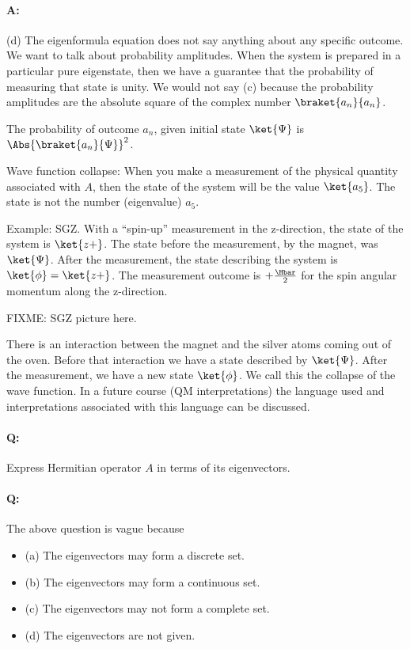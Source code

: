 \paragraph{A:} (d) The eigenformula equation does not say anything about any specific outcome.  We want to talk about probability amplitudes.  When the system is prepared in a particular pure eigenstate, then we have a guarantee that the probability of measuring that state is unity.  We would not say (c) because the probability amplitudes are the absolute square of the complex number $\braket{a_n}{a_n}$.

The probability of outcome $a_n$, given initial state $\ket{\Psi}$ is $\Abs{\braket{a_n}{\Psi}}^2$.

Wave function collapse:  When you make a measurement of the physical quantity associated with $A$, then the state of the system will be the value $\ket{a_5}$.  The state is not the number (eigenvalue) $a_5$.

Example: SGZ.  With a ``spin-up'' measurement in the z-direction, the state of the system is $\ket{z+}$.  The state before the measurement, by the magnet, was $\ket{\Psi}$.  After the measurement, the state describing the system is $\ket{\phi} = \ket{z+}$.  The measurement outcome is $+\frac{\Hbar}{2}$ for the spin angular momentum along the z-direction.

FIXME: SGZ picture here.

There is an interaction between the magnet and the silver atoms coming out of the oven.  Before that interaction we have a state described by $\ket{\Psi}$.  After the measurement, we have a new state $\ket{\phi}$.  We call this the collapse of the wave function.  In a future course (QM interpretations) the language used and interpretations associated with this language can be discussed.

\paragraph{Q:} Express Hermitian operator $A$ in terms of its eigenvectors.
\paragraph{Q:} The above question is vague because

\begin{itemize}
\item (a) The eigenvectors may form a discrete set.
\item (b) The eigenvectors may form a continuous set.
\item (c) The eigenvectors may not form a complete set.
\item (d) The eigenvectors are not given.
\end{itemize}

